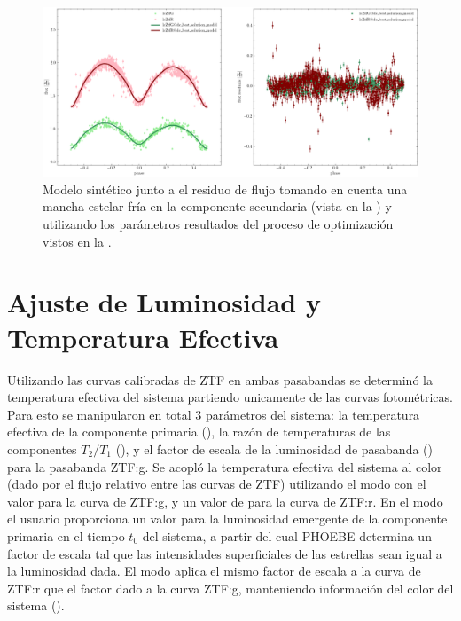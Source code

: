 \begin{figure}[!ht]
	\centering
	\includegraphics[scale=0.45]{Metodologia/Secciones/ModeloComputacional/Figures/Figura Opt DC Resultados ZTF.png}
	\caption{Modelo sintético junto a el residuo de flujo tomando en cuenta una
	mancha estelar fría en la componente secundaria (vista en la
	) y utilizando los parámetros resultados del
	proceso de optimización vistos en la .}
	\label{figuraOptDcResultadosZtf}
\end{figure}

\section{Ajuste de Luminosidad y Temperatura Efectiva} \label{metodologia:modelocomputacional:ajuste_luminosidad_teff}

Utilizando las curvas calibradas de ZTF en ambas pasabandas se determinó la
temperatura efectiva del sistema partiendo unicamente de las curvas
fotométricas. Para esto se manipularon en total 3 parámetros del sistema: la
temperatura efectiva de la componente primaria (), la razón
de temperaturas de las componentes $T_2 / T_1$ (), y el factor
de escala de la luminosidad de pasabanda () para la
pasabanda ZTF:g. Se acopló la temperatura efectiva del sistema al color (dado
por el flujo relativo entre las curvas de ZTF) utilizando el modo
 con el valor  para la curva de ZTF:g,
y un valor de  para la curva de ZTF:r. En el modo
 el usuario proporciona un valor para la luminosidad
emergente de la componente primaria en el tiempo $t_0$ del sistema, a partir del
cual PHOEBE determina un factor de escala tal que las intensidades superficiales
de las estrellas sean igual a la luminosidad dada. El modo
 aplica el mismo factor de escala a la curva de ZTF:r que
el factor dado a la curva ZTF:g, manteniendo información del color del sistema
(). 

